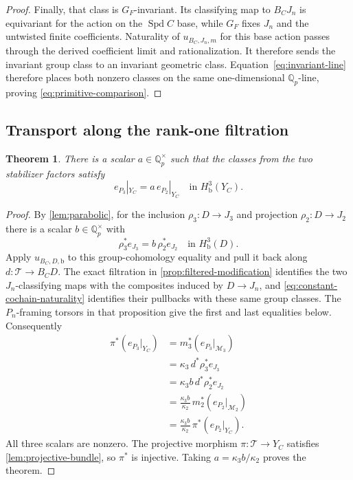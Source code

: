 \documentclass[11pt]{article}
\numberwithin{equation}{section}
\newtheorem{theorem}{Theorem}[section]
\theoremstyle{definition}
\theoremstyle{remark}
\newcommand{\Q}{\mathbb Q}
\DeclareMathOperator{\Spd}{Spd}
\begin{document}
\begin{proof}
Finally, that class is $G_F$-invariant.  Its classifying map to
$B_CJ_n$ is equivariant for the action on the $\Spd C$ base, while
$G_F$ fixes $J_n$ and the untwisted finite coefficients.  Naturality
of $u_{B_C,J_n,m}$ for this base action passes through the derived
coefficient limit and rationalization.  It therefore sends the
invariant group class to an invariant geometric class.
Equation~\eqref{eq:invariant-line} therefore places both nonzero
classes on the same one-dimensional $\Q_p$-line, proving
\cref{eq:primitive-comparison}.
\end{proof}

\subsection{Transport along the rank-one filtration}

\begin{theorem}\label{thm:geometric-transport}
There is a scalar $a\in\Q_p^\times$ such that the classes from the two
stabilizer factors satisfy
\begin{equation}\label{eq:geometric-transport}
 e_{P_3}|_{Y_C}=a\,e_{P_2}|_{Y_C}
       \quad\text{in }H^3_{\mathrm b}(Y_C).
\end{equation}
\end{theorem}

\begin{proof}
By \cref{lem:parabolic}, for the inclusion $\rho_3:D\to J_3$ and
projection $\rho_2:D\to J_2$ there is a scalar $b\in\Q_p^\times$
with
\[
 \rho_3^*e_{J_3}=b\,\rho_2^*e_{J_2}
       \quad\text{in }H^3_{\mathrm b}(D).
\]
Apply $u_{B_C,D,\mathrm b}$ to this group-cohomology equality and
pull it back along $d:\mathcal T\to B_CD$.
The exact filtration in \cref{prop:filtered-modification} identifies
the two $J_n$-classifying maps with the composites induced by
$D\to J_n$, and \eqref{eq:constant-cochain-naturality} identifies
their pullbacks with these same group classes.  The $P_n$-framing
torsors in that proposition give the first and last equalities below.
Consequently
\[
 \begin{aligned}
 \pi^*(e_{P_3}|_{Y_C})
   &=m_3^*(e_{P_3}|_{\mathcal M_3})\\
   &=\kappa_3\,d^*\rho_3^*e_{J_3}\\
   &=\kappa_3b\,d^*\rho_2^*e_{J_2}\\
   &=\frac{\kappa_3b}{\kappa_2}\,
                  m_2^*(e_{P_2}|_{\mathcal M_2})\\
   &=\frac{\kappa_3b}{\kappa_2}\,\pi^*(e_{P_2}|_{Y_C}).
 \end{aligned}
\]
All three scalars are nonzero.  The projective morphism
$\pi:\mathcal T\to Y_C$ satisfies
\cref{lem:projective-bundle}, so $\pi^*$ is injective.
Taking $a=\kappa_3b/\kappa_2$ proves the theorem.
\end{proof}
\end{document}
